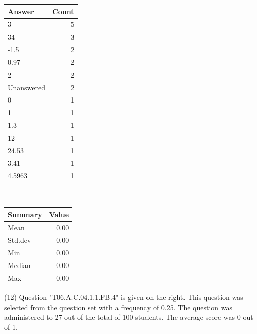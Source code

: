 \documentclass[12pt,nohyper]{tufte-handout}\usepackage[]{graphicx}\usepackage[]{color}
\begin{document}
\begin{center}%
\begin{tabular}{lr}
  \hline
Answer & Count \\ 
  \hline
3 &   5 \\ 
  34 &   3 \\ 
  -1.5 &   2 \\ 
  0.97 &   2 \\ 
  2 &   2 \\ 
  Unanswered &   2 \\ 
  0 &   1 \\ 
  1 &   1 \\ 
  1.3 &   1 \\ 
  12 &   1 \\ 
  24.53 &   1 \\ 
  3.41 &   1 \\ 
  4.5963 &   1 \\ 
   \hline
\end{tabular}
~~~~~~~~%
\begin{tabular}{lr}
  \hline
Summary & Value \\ 
  \hline
Mean & 0.00 \\ 
  Std.dev & 0.00 \\ 
  Min & 0.00 \\ 
  Median & 0.00 \\ 
  Max & 0.00 \\ 
   \hline
\end{tabular}
\end{center}\newpage{} (12) Question "T06.A.C.04.1.1.FB.4" is given on the right. This question was selected from the question set with a frequency of 0.25. The question was administered to 27 out of the total of 100 students. The average score was 0 out of 1.
\end{document}
